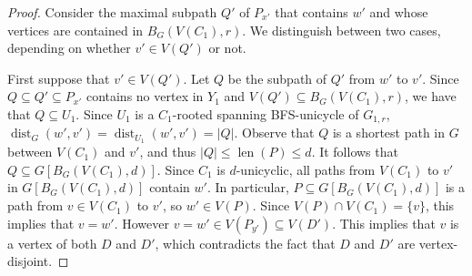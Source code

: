 \documentclass{patmorin}
\newcommand{\gwen}[1]{\textcolor{Purple}{Gwen: #1}}
\newcommand{\piotr}[1]{\textcolor{red}{Piotr: #1}}
\DeclareMathOperator{\len}{len}
\DeclareMathOperator{\dist}{dist}
\begin{document}
\begin{proof}
    Consider the maximal subpath $Q'$ of $P_{x'}$ that contains $w'$ and whose vertices are contained in $B_G(V(C_1),r)$.  We distinguish between two cases, depending on whether $v'\in V(Q')$ or not.

    First suppose that $v'\in V(Q')$.
    Let $Q$ be the subpath of $Q'$ from $w'$ to $v'$. Since $Q\subseteq Q'\subseteq P_{x'}$ contains  no vertex in $Y_1$ and $V(Q')\subseteq B_G(V(C_1),r)$, we have that $Q\subseteq U_1$. Since $U_1$ is a $C_1$-rooted spanning BFS-unicycle of $G_{1,r}$, $\dist_G(w',v')=\dist_{U_1}(w',v')=|Q|$.
    Observe that $Q$ is a shortest path in $G$ between $V(C_1)$ and $v'$, and thus $|Q| \leq \len(P) \leq d$.
    It follows that $Q\subseteq G[B_G(V(C_1),d)]$.
    Since $C_1$ is $d$-unicyclic, all paths from $V(C_1)$ to $v'$ in $G[B_G(V(C_1),d)]$ contain $w'$.
    In particular, $P\subseteq G[B_G(V(C_1),d)]$ is a path from $v\in V(C_1)$ to $v'$, so $w'\in V(P)$.  Since $V(P)\cap V(C_1)=\{v\}$, this implies that $v=w'$.
    However $v=w' \in V(P_{y'})\subseteq V(D')$. This implies that $v$ is a vertex of both $D$ and $D'$, which contradicts the fact that $D$ and $D'$ are vertex-disjoint.


\end{proof}
\end{document}
